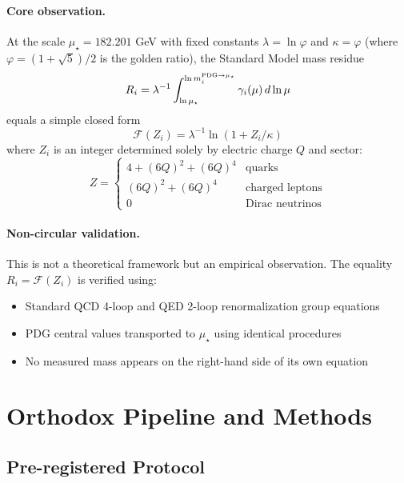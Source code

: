 \documentclass[11pt]{article}
\begin{document}
\paragraph{Core observation.}
At the scale $\mu_\star = 182.201$ GeV with fixed constants $\lambda = \ln\varphi$ and $\kappa = \varphi$ (where $\varphi = (1+\sqrt{5})/2$ is the golden ratio), the Standard Model mass residue
\begin{equation}
R_i = \lambda^{-1}\int_{\ln\mu_\star}^{\ln m_i^{\rm PDG\to\mu_\star}}\gamma_i(\mu)\,d\ln\mu
\label{eq:residue-def}
\end{equation}
equals a simple closed form
\begin{equation}
\mathcal{F}(Z_i) = \lambda^{-1}\ln(1+Z_i/\kappa)
\label{eq:gap-def}
\end{equation}
where $Z_i$ is an integer determined solely by electric charge $Q$ and sector:
\begin{equation}
Z = \begin{cases}
4 + (6Q)^2 + (6Q)^4 & \text{quarks}\\
(6Q)^2 + (6Q)^4 & \text{charged leptons}\\
0 & \text{Dirac neutrinos}
\end{cases}
\label{eq:Z-def}
\end{equation}

\paragraph{Non-circular validation.}
This is not a theoretical framework but an empirical observation. The equality $R_i = \mathcal{F}(Z_i)$ is verified using:
\begin{itemize}
\item Standard QCD 4-loop and QED 2-loop renormalization group equations
\item PDG central values transported to $\mu_\star$ using identical procedures
\item No measured mass appears on the right-hand side of its own equation
\end{itemize}

\section{Orthodox Pipeline and Methods}

\subsection{Pre-registered Protocol}
\end{document}
